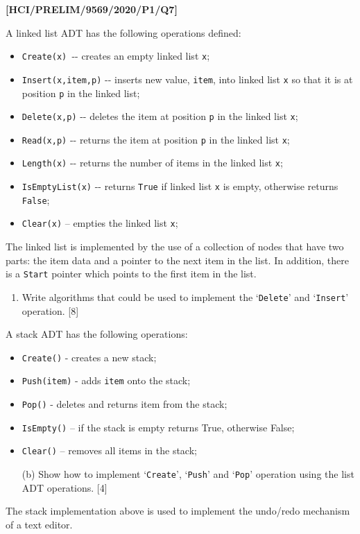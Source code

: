 \item \textbf{{[}HCI/PRELIM/9569/2020/P1/Q7{]} }

A linked list ADT has the following operations defined: 
\begin{itemize}
\item \texttt{Create(x) }-{}- creates an empty linked list \texttt{x}; 
\item \texttt{Insert(x,item,p)} -{}- inserts new value, \texttt{item}, into
linked list \texttt{x} so that it is at position \texttt{p} in the
linked list; 
\item \texttt{Delete(x,p)} -{}- deletes the item at position \texttt{p}
in the linked list \texttt{x}; 
\item \texttt{Read(x,p)} -{}- returns the item at position \texttt{p} in
the linked list \texttt{x}; 
\item \texttt{Length(x)} -{}- returns the number of items in the linked
list \texttt{x}; 
\item \texttt{IsEmptyList(x)} -{}- returns \texttt{True} if linked list
\texttt{x} is empty, otherwise returns \texttt{False}; 
\item \texttt{Clear(x)} -- empties the linked list \texttt{x};
\end{itemize}
The linked list is implemented by the use of a collection of nodes
that have two parts: the item data and a pointer to the next item
in the list. In addition, there is a \texttt{Start} pointer which
points to the first item in the list.
\begin{enumerate}
\item Write algorithms that could be used to implement the \textquoteleft \texttt{Delete}\textquoteright{}
and \textquoteleft \texttt{Insert}\textquoteright{} operation. \hfill{}{[}8{]}
\end{enumerate}
A stack ADT has the following operations:
\begin{itemize}
\item \texttt{Create()} - creates a new stack; 
\item \texttt{Push(item)} - adds \texttt{item} onto the stack; 
\item \texttt{Pop()} - deletes and returns item from the stack; 
\item \texttt{IsEmpty()} -- if the stack is empty returns True, otherwise
False; 
\item \texttt{Clear()} -- removes all items in the stack;
\end{itemize}
\begin{enumerate}
\item[(b)]  Show how to implement \textquoteleft \texttt{Create}\textquoteright ,
\textquoteleft \texttt{Push}\textquoteright{} and \textquoteleft \texttt{Pop}\textquoteright{}
operation using the list ADT operations.\hfill{} {[}4{]}
\end{enumerate}
The stack implementation above is used to implement the undo/redo
mechanism of a text editor. 

